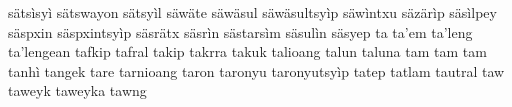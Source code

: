 \documentclass[a4paper]{article}
\begin{document}
sätsìsyì\hspace{2mm}
sätswayon\hspace{2mm}
sätsyìl\hspace{2mm}
säwäte\hspace{2mm}
säwäsul\hspace{2mm}
säwäsultsyìp\hspace{2mm}
säwìntxu\hspace{2mm}
säzärìp\hspace{2mm}
säsìlpey\hspace{2mm}
säspxin\hspace{2mm}
säspxintsyìp\hspace{2mm}
säsrätx\hspace{2mm}
säsrìn\hspace{2mm}
sästarsìm\hspace{2mm}
säsulìn\hspace{2mm}
säsyep\hspace{2mm}
ta\hspace{2mm}
ta'em\hspace{2mm}
ta'leng\hspace{2mm}
ta'lengean\hspace{2mm}
tafkip\hspace{2mm}
tafral\hspace{2mm}
takip\hspace{2mm}
takrra\hspace{2mm}
takuk\hspace{2mm}
talioang\hspace{2mm}
talun\hspace{2mm}
taluna\hspace{2mm}
tam\hspace{2mm}
tam tam\hspace{2mm}
tanhì\hspace{2mm}
tangek\hspace{2mm}
tare\hspace{2mm}
tarnioang\hspace{2mm}
taron\hspace{2mm}
taronyu\hspace{2mm}
taronyutsyìp\hspace{2mm}
tatep\hspace{2mm}
tatlam\hspace{2mm}
tautral\hspace{2mm}
taw\hspace{2mm}
taweyk\hspace{2mm}
taweyka\hspace{2mm}
tawng\hspace{2mm}
\end{document}
